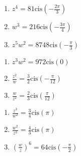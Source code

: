 \begin{multicols}{3} 

\begin{enumerate}

\setcounter{enumi}{\value{HW}}

\item $z^{4} = 81\text{cis}\left(-\frac{2\pi}{3}\right)$
\item $w^{3} = 216\text{cis}\left(-\frac{3\pi}{4}\right)$
\item $z^{5}w^{2} = 8748\text{cis}\left(-\frac{\pi}{3}\right)$

\setcounter{HW}{\value{enumi}}

\end{enumerate}

\end{multicols}

\begin{multicols}{3} 

\begin{enumerate}

\setcounter{enumi}{\value{HW}}

\item $z^3w^2 = 972 \text{cis}(0)$
\item $\frac{z^2}{w} =\frac{3}{2}\text{cis}\left(-\frac{\pi}{12}\right)$
\item $\frac{w}{z^2} =\frac{2}{3}\text{cis}\left(\frac{\pi}{12}\right)$

\setcounter{HW}{\value{enumi}}

\end{enumerate}

\end{multicols}

\begin{multicols}{3} 

\begin{enumerate}

\setcounter{enumi}{\value{HW}}

\item $\frac{z^3}{w^2} =\frac{3}{4}\text{cis}(\pi)$
\item $\frac{w^2}{z^3} =\frac{4}{3}\text{cis}(\pi)$
\item $\left(\frac{w}{z}\right)^6 =64\text{cis}\left(-\frac{\pi}{2} \right)$

\setcounter{HW}{\value{enumi}}

\end{enumerate}

\end{multicols}

